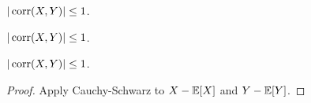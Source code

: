 \begin{note}
  \begin{field}
    \begin{prop}
      $|\operatorname{corr}(X, Y)| \leq 1$.
    \end{prop}
  \end{field}
  \begin{field}
    \begin{prop}
      $|\operatorname{corr}(X, Y)| \leq 1$.
    \end{prop}
  \end{field}
  \xplain{}%
\end{note}

%
\begin{note}
  \begin{field}
    \begin{prop}
      $|\operatorname{corr}(X, Y)| \leq 1$.
    \end{prop}
  \end{field}
  \begin{field}
    \begin{proof}
      Apply Cauchy-Schwarz to $X - \mathbb{E}[X]$ and $Y - \mathbb{E}[Y]$.
    \end{proof}
  \end{field}
  \xplain{}%
\end{note}

